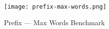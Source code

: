 \begin{figure}[H]
    \centering
    \texttt{[image: prefix-max-words.png]}
    \caption{Prefix --- Max Words Benchmark}\label{fig:prefix_max_words_bm}
\end{figure}